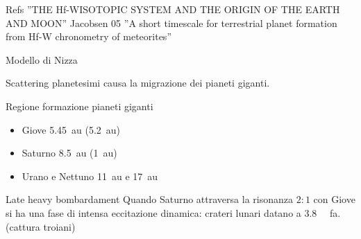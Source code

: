 \begin{wordonframe}{Refs}
''THE Hf-WISOTOPIC SYSTEM AND THE ORIGIN OF THE EARTH AND MOON'' Jacobsen 05
''A short timescale for terrestrial planet formation from Hf-W chronometry of meteorites''
\end{wordonframe}

\begin{frame}{Modello di Nizza}

Scattering planetesimi causa la migrazione dei pianeti giganti.

\begin{block}{Regione formazione pianeti giganti}
\begin{itemize}
\item Giove \SI{5.45}{\astronomicalunit} (\SI{5.2}{\astronomicalunit})
\item Saturno \SI{8.5}{\astronomicalunit} (\SI{1}{\astronomicalunit})
\item Urano e Nettuno \SI{11}{\astronomicalunit} e \SI{17}{\astronomicalunit}
\end{itemize}
\end{block}
\begin{block}{Late heavy bombardament}
Quando Saturno attraversa la risonanza $2:1$ con Giove si ha una fase di intensa eccitazione dinamica: crateri lunari datano a \SI{3.8}{\giga\year} fa. (cattura troiani)
\end{block}
\end{frame}
            